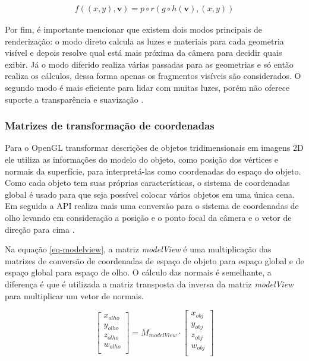 \begin{equation} \label{eq-pipeline} \tag{1}
	\begin{aligned}
		f((x,y), \mathbf{v})=p \circ r(g \circ h(\mathbf{v}), (x,y)) 
	\end{aligned}
\end{equation}

Por fim, é importante mencionar que existem dois modos principais de renderização: o modo direto calcula as luzes e materiais para cada geometria visível e depois resolve qual está mais próxima da câmera para decidir quais exibir. Já o modo diferido realiza várias passadas para as geometrias e só então realiza os cálculos, dessa forma apenas os fragmentos visíveis são considerados. O segundo modo é mais eficiente para lidar com muitas luzes, porém não oferece suporte a transparência e suavização \cite{vsmid2017comparison}.

\subsubsection{Matrizes de transformação de coordenadas}
\label{sec:matrizes-transformacao-coordenadas}

Para o OpenGL transformar descrições de objetos tridimensionais em imagens 2D ele utiliza as informações do modelo do objeto, como posição dos vértices e normais da superfície, para interpretá-las como coordenadas do espaço do objeto. Como cada objeto tem suas próprias características, o sistema de coordenadas global é usado para que seja possível colocar vários objetos em uma única cena. Em seguida a API realiza mais uma conversão para o sistema de coordenadas de olho levando em consideração a posição e o ponto focal da câmera e o vetor de direção para cima \cite{GLSLBook}. 

Na equação \ref{eq-modelview}, a matriz \textit{modelView} é uma multiplicação das matrizes de conversão de coordenadas de espaço de objeto para espaço global e de espaço global para espaço de olho. O cálculo das normais é semelhante, a diferença é que é utilizada a matriz transposta da inversa da matriz \textit{modelView} para multiplicar um vetor de normais. 

\begin{equation} \label{eq-modelview} \tag{2}
	\begin{bmatrix}
		x_{olho} \\
		y_{olho} \\
		z_{olho} \\
		w_{olho} \\
	\end{bmatrix}
	=
	M_{modelView} \cdot
	\begin{bmatrix}
		x_{obj} \\
		y_{obj} \\
		z_{obj} \\
		w_{obj} \\
	\end{bmatrix}
\end{equation}

